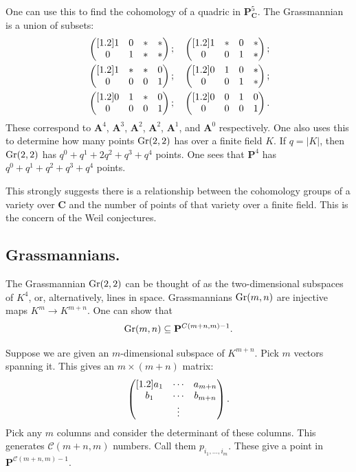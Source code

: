 \documentclass [11 pt, oneside] {article}
\begin{document}
One can use this to find the cohomology of a quadric in $\mathbf{P}^5_{\mathbf{C}}$. The Grassmannian is a union of subsets:
\begin{align*}
	&\begin{pmatrix} [1.2] 1&0&*&*\\0&1&*&*\end{pmatrix};
	\quad\begin{pmatrix} [1.2] 1&*&0&*\\0&0&1&*\end{pmatrix};\\
	&\begin{pmatrix} [1.2] 1&*&*&0\\0&0&0&1\end{pmatrix};
	\quad\begin{pmatrix} [1.2] 0&1&0&*\\0&0&1&*\end{pmatrix};\\
	&\begin{pmatrix} [1.2] 0&1&*&0\\0&0&0&1\end{pmatrix};
	\quad\begin{pmatrix} [1.2] 0&0&1&0\\0&0&0&1\end{pmatrix}.
\end{align*}
These correspond to $\mathbf{A}^4$, $\mathbf{A}^3$, $\mathbf{A}^2$, $\mathbf{A}^2$, $\mathbf{A}^1$, and $\mathbf{A}^0$ respectively. One also uses this to determine how many points $\operatorname{Gr}(2,2)$ has over a finite field $K$. If $q=\left\lvert K \right\rvert $, then $\operatorname{Gr}(2,2)$ has $q^0 + q^1 + 2q^2 + q^3+q^4$ points. One sees that $\mathbf{P}^4$ has $q^0+q^1+q^2+q^3+q^4$ points.

This strongly suggests there is a relationship between the cohomology groups of a variety over $\mathbf{C}$ and the number of points of that variety over a finite field. This is the concern of the Weil conjectures.

\subsection{Grassmannians.}
The Grassmannian $\operatorname{Gr}(2,2)$ can be thought of as the two-dimensional subspaces of $K^4$, or, alternatively, lines in space. Grassmannians $\operatorname{Gr}(m,n)$ are injective maps $K^m \longrightarrow K^{m+n}$.
One can show that
\begin{align*}
	\operatorname{Gr}(m,n) \subseteq  \mathbf{P}^{\relax{C}({m+n},{m})-1}.
\end{align*}

Suppose we are given an $m$-dimensional subspace of $K^{m+n}$. Pick $m$ vectors spanning it. This gives an $m\times(m+n)$ matrix:
\begin{align*}
	\begin{pmatrix} [1.2] a_1&\cdots &a_{m+n}\\b_1&\cdots &b_{m+n}\\&\vdots\end{pmatrix}.
\end{align*}
Pick any $m$ columns and consider the determinant of these columns. This generates $\mathscr{C}({m+n},{m})$ numbers. Call them $p_{{i_1},\hdots,{i_m}}$. These give a point in $\mathbf{P}^{\mathscr{C}({m+n},{m}) - 1}$. 
\end{document}
